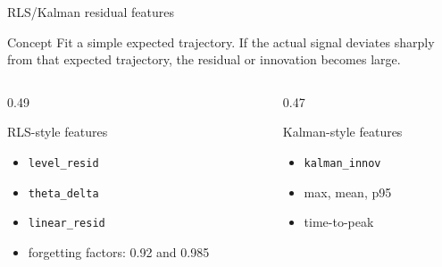 \documentclass[10pt,aspectratio=169]{beamer}
\newcommand{\code}[1]{\texttt{\footnotesize #1}}
\begin{document}
\begin{frame}{RLS/Kalman residual features}
\small
\begin{block}{Concept}
Fit a simple expected trajectory. If the actual signal deviates sharply from that expected trajectory, the residual or innovation becomes large.
\end{block}
\begin{columns}[T,totalwidth=\textwidth]
\begin{column}{0.49\textwidth}
\begin{exampleblock}{RLS-style features}
\begin{itemize}
  \item \code{level\_resid}
  \item \code{theta\_delta}
  \item \code{linear\_resid}
  \item forgetting factors: 0.92 and 0.985
\end{itemize}
\end{exampleblock}
\end{column}
\begin{column}{0.47\textwidth}
\begin{alertblock}{Kalman-style features}
\begin{itemize}
  \item \code{kalman\_innov}
  \item max, mean, p95
  \item time-to-peak
\end{itemize}
\end{alertblock}
\end{column}
\end{columns}
\end{frame}
\end{document}

